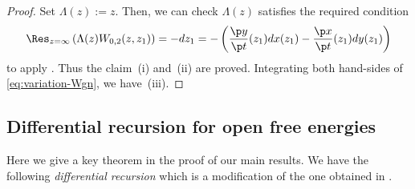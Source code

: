 \begin{proof}
Set $\Lambda(z) := z$.
Then, we can check $\Lambda(z)$ satisf\/ies
the required condition
\begin{gather*} %
\Res_{z=\infty} \left( \Lambda(z) W_{0,2}(z,z_{1}) \right) = - dz_{1}
= - \left(\frac{\p y}{\p t}(z_{1}) dx(z_{1}) -
\frac{\p x}{\p t}(z_{1}) dy(z_{1}) \right)
\end{gather*} %
to apply \cite[Theorem~5.1]{EO07}. Thus the claim~(i) and~(ii)
are proved. Integrating both hand-sides of
\eqref{eq:variation-Wgn}, we have~(iii).
\end{proof}

\subsection{Dif\/ferential recursion for open free energies}

Here we give a key theorem in the proof of our main results.
We have the following {\em differential recursion} which is
a modif\/ication of the one obtained in \cite{DM14, DM14-2}.

